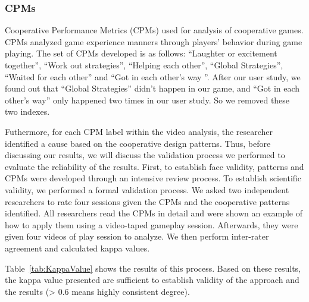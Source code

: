 \subsubsection{CPMs}

Cooperative Performance Metrics (CPMs)\cite{CPMs} used for analysis of cooperative games. CPMs analyzed game experience manners through players' behavior during game playing. The set of CPMs developed is as follows: ``Laughter or excitement together'', ``Work out strategies'', ``Helping each other'', ``Global Strategies'', ``Waited for each other'' and ``Got in each other's way ''. 
After our user study, we found out that ``Global Strategies'' didn't happen in our game, and ``Got in each other's way'' only happened two times in our user study. So we removed these two indexes.

Futhermore, for each CPM label within the video analysis, the researcher identified a cause based on the cooperative design patterns. Thus, before discussing our results, we will discuss the validation process we performed to evaluate the reliability of the results. First, to establish face validity, patterns and CPMs were developed through an intensive review process. To establish scientific validity, we performed a formal validation process. We asked two independent researchers to rate four sessions given the CPMs and the cooperative patterns identified. All researchers read the CPMs in detail and were shown an example of how to apply them using a video-taped gameplay session. Afterwards, they were given four videos of play session to analyze. We then perform inter-rater agreement and calculated kappa values\cite{Kappa1,Kappa2}. 

Table~\ref{tab:KappaValue} shows the results of this process. Based on these results, the kappa value presented are sufficient to establish validity of the approach and the results (> 0.6 means highly consistent degree).

